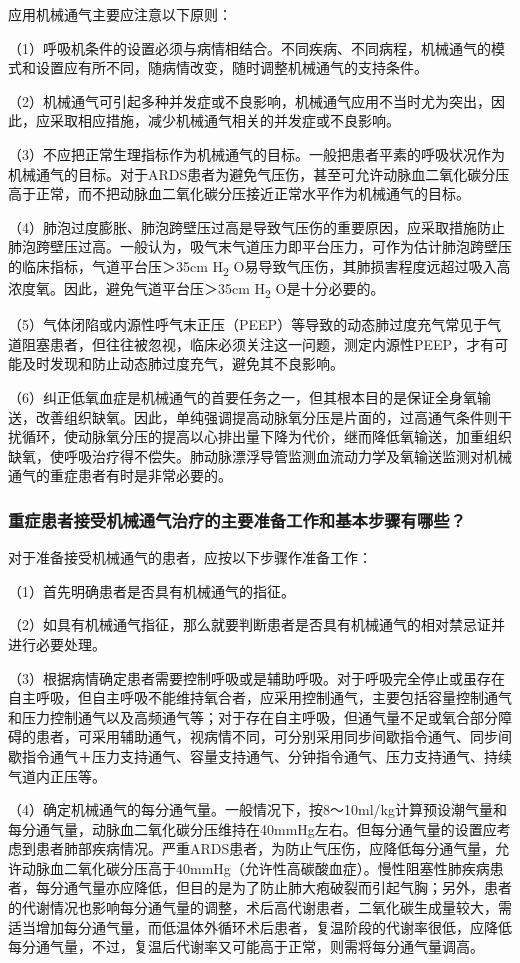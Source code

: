 应用机械通气主要应注意以下原则：

（1）呼吸机条件的设置必须与病情相结合。不同疾病、不同病程，机械通气的模式和设置应有所不同，随病情改变，随时调整机械通气的支持条件。

（2）机械通气可引起多种并发症或不良影响，机械通气应用不当时尤为突出，因此，应采取相应措施，减少机械通气相关的并发症或不良影响。

（3）不应把正常生理指标作为机械通气的目标。一般把患者平素的呼吸状况作为机械通气的目标。对于ARDS患者为避免气压伤，甚至可允许动脉血二氧化碳分压高于正常，而不把动脉血二氧化碳分压接近正常水平作为机械通气的目标。

（4）肺泡过度膨胀、肺泡跨壁压过高是导致气压伤的重要原因，应采取措施防止肺泡跨壁压过高。一般认为，吸气末气道压力即平台压力，可作为估计肺泡跨壁压的临床指标，气道平台压＞35cm
H\textsubscript{2}
O易导致气压伤，其肺损害程度远超过吸入高浓度氧。因此，避免气道平台压＞35cm
H\textsubscript{2} O是十分必要的。

（5）气体闭陷或内源性呼气末正压（PEEP）等导致的动态肺过度充气常见于气道阻塞患者，但往往被忽视，临床必须关注这一问题，测定内源性PEEP，才有可能及时发现和防止动态肺过度充气，避免其不良影响。

（6）纠正低氧血症是机械通气的首要任务之一，但其根本目的是保证全身氧输送，改善组织缺氧。因此，单纯强调提高动脉氧分压是片面的，过高通气条件则干扰循环，使动脉氧分压的提高以心排出量下降为代价，继而降低氧输送，加重组织缺氧，使呼吸治疗得不偿失。肺动脉漂浮导管监测血流动力学及氧输送监测对机械通气的重症患者有时是非常必要的。

\subsubsection{重症患者接受机械通气治疗的主要准备工作和基本步骤有哪些？}

对于准备接受机械通气的患者，应按以下步骤作准备工作：

（1）首先明确患者是否具有机械通气的指征。

（2）如具有机械通气指征，那么就要判断患者是否具有机械通气的相对禁忌证并进行必要处理。

（3）根据病情确定患者需要控制呼吸或是辅助呼吸。对于呼吸完全停止或虽存在自主呼吸，但自主呼吸不能维持氧合者，应采用控制通气，主要包括容量控制通气和压力控制通气以及高频通气等；对于存在自主呼吸，但通气量不足或氧合部分障碍的患者，可采用辅助通气，视病情不同，可分别采用同步间歇指令通气、同步间歇指令通气＋压力支持通气、容量支持通气、分钟指令通气、压力支持通气、持续气道内正压等。

（4）确定机械通气的每分通气量。一般情况下，按8～10ml/kg计算预设潮气量和每分通气量，动脉血二氧化碳分压维持在40mmHg左右。但每分通气量的设置应考虑到患者肺部疾病情况。严重ARDS患者，为防止气压伤，应降低每分通气量，允许动脉血二氧化碳分压高于40mmHg（允许性高碳酸血症）。慢性阻塞性肺疾病患者，每分通气量亦应降低，但目的是为了防止肺大疱破裂而引起气胸；另外，患者的代谢情况也影响每分通气量的调整，术后高代谢患者，二氧化碳生成量较大，需适当增加每分通气量，而低温体外循环术后患者，复温阶段的代谢率很低，应降低每分通气量，不过，复温后代谢率又可能高于正常，则需将每分通气量调高。

